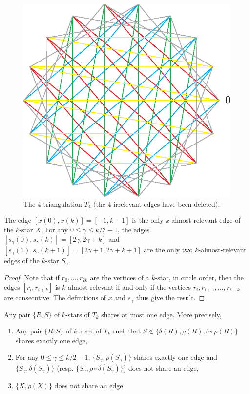 \documentclass[12pt]{amsart}
\begin{document}
\begin{figure}
\centerline{\includegraphics[scale=1]{18-gon.eps}}
\caption{\small{The $4$-triangulation $T_4$ (the $4$-irrelevant edges have been deleted).}}\label{18-gon}
\end{figure}

\begin{lemma}
The edge $[x(0),x(k)]=[-1,k-1]$ is the only $k$-almost-relevant edge of the $k$-star $X$. For any $0\le\gamma\le k/2-1$, the edges $[s_\gamma(0),s_{\gamma}(k)]=[2\gamma,2\gamma+k]$ and $[s_\gamma(1),s_{\gamma}(k+1)]=[2\gamma+1,2\gamma+k+1]$ are the only two $k$-almost-relevant edges of the $k$-star $S_\gamma$.
\end{lemma}

\begin{proof}
Note that if $r_0,\ldots,r_{2k}$ are the vertices of a $k$-star, in circle order, then the edges $[r_i,r_{i+k}]$ is $k$-almost-relevant if and only if the vertices $r_i,r_{i+1},\ldots, r_{i+k}$ are consecutive. The definitions of $x$ and $s_\gamma$ thus give the result.
\end{proof}

\begin{lemma}
Any pair $\{R,S\}$ of $k$-stars of $T_k$ shares at most one edge. More precisely,
\begin{enumerate}
\item Any pair $\{R,S\}$ of $k$-stars of $T_k$ such that $S\notin\{\delta(R),\rho(R),\delta\circ\rho(R)\}$ shares exactly one edge,
\item For any $0\le\gamma\le k/2-1$, $\{S_\gamma,\rho(S_\gamma)\}$ shares exactly one edge and $\{S_\gamma,\delta(S_\gamma)\}$ (resp. $\{S_\gamma,\rho\circ\delta(S_\gamma)\}$) does not share an edge,
\item $\{X,\rho(X)\}$ does not share an edge.
\end{enumerate}
\end{lemma}
\end{document}
